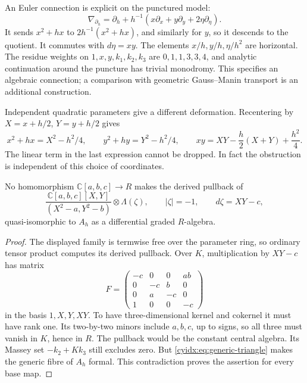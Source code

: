 An Euler connection is explicit on the punctured model:
\begin{equation}\label{cyidx:eq:Euler-connection}
 \nabla_{\partial_h}=\partial_h+
        h^{-1}(x\partial_x+y\partial_y+2\eta\partial_\eta).
\end{equation}
It sends \(x^2+hx\) to \(2h^{-1}(x^2+hx)\), and
similarly for \(y\), so it descends to the quotient.
It commutes with \(d\eta=xy\). The elements
\(x/h,y/h,\eta/h^2\) are horizontal. The residue
weights on \(1,x,y,k_1,k_2,k_3\) are
\(0,1,1,3,3,4\), and analytic continuation around
the puncture has trivial monodromy. This specifies
an algebraic connection; a comparison with geometric
Gauss--Manin transport is an additional construction.

Independent quadratic parameters give a different
deformation. Recentering by \(X=x+h/2\), \(Y=y+h/2\)
gives
\[
 x^2+hx=X^2-h^2/4,\qquad y^2+hy=Y^2-h^2/4,
 \qquad xy=XY-\frac h2(X+Y)+\frac{h^2}{4}.
\]
The linear term in the last expression cannot be dropped.
In fact the obstruction is independent of this choice
of coordinates.

\begin{proposition}\label{cyidx:prop:quadratic-family}
No homomorphism \(\mathbb C[a,b,c]\to R\) makes the
derived pullback of
\[
 \frac{\mathbb C[a,b,c][X,Y]}{(X^2-a,Y^2-b)}
           \otimes\Lambda(\zeta),\qquad |\zeta|=-1,
           \qquad d\zeta=XY-c,
\]
quasi-isomorphic to \(A_h\) as a differential graded
\(R\)-algebra.
\end{proposition}
\begin{proof}
The displayed family is termwise free over the parameter
ring, so ordinary tensor product computes its derived
pullback. Over \(K\), multiplication by \(XY-c\) has
matrix
\begin{equation}\label{cyidx:eq:quadratic-matrix}
 F=\begin{pmatrix}
 -c&0&0&ab\\0&-c&b&0\\0&a&-c&0\\1&0&0&-c
 \end{pmatrix}
\end{equation}
in the basis \(1,X,Y,XY\). To have three-dimensional
kernel and cokernel it must have rank one. Its
two-by-two minors include \(a,b,c\), up to signs,
so all three must vanish in \(K\), hence in \(R\).
The pullback would be the constant central algebra.
Its Massey set \(-k_2+Kk_3\) still excludes zero.
But \eqref{cyidx:eq:generic-triangle} makes the generic
fibre of \(A_h\) formal. This contradiction proves
the assertion for every base map.
\end{proof}

